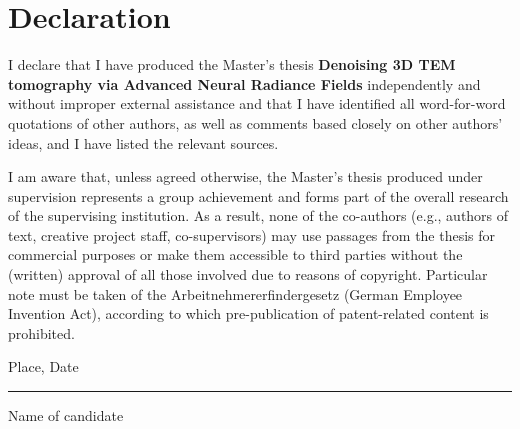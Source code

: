 \chapter{Declaration}


\noindent I declare that I have produced the Master’s thesis \textbf{Denoising 3D TEM tomography via Advanced Neural Radiance Fields} independently and without improper external assistance and that I have identified all word-for-word quotations of other authors, as well as comments based closely on other authors’ ideas, and I have listed the relevant sources.

\vspace{1em}

\noindent I am aware that, unless agreed otherwise, the Master’s thesis produced under supervision represents a group achievement and forms part of the overall research of the supervising institution. As a result, none of the co-authors (e.g., authors of text, creative project staff, co-supervisors) may use passages from the thesis for commercial purposes or make them accessible to third parties without the (written) approval of all those involved due to reasons of copyright. Particular note must be taken of the Arbeitnehmererfindergesetz (German Employee Invention Act), according to which pre-publication of patent-related content is prohibited.

\vspace{4em} %

\hfill Place, Date

\vspace{3em} %

\hfill \rule{6cm}{0.4pt} %

\hfill Name of candidate